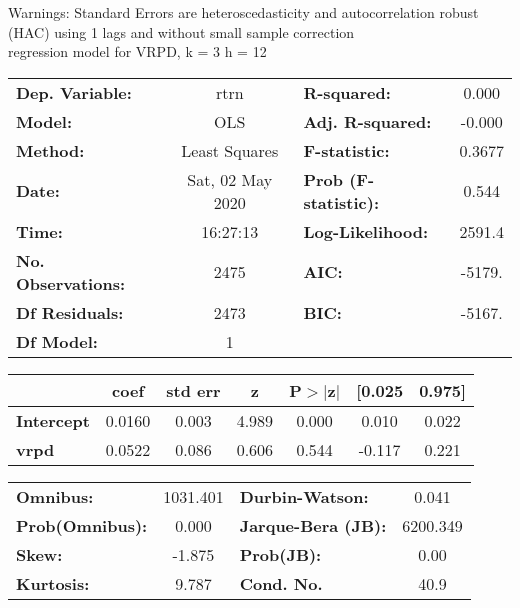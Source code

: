 Warnings: \newline
 [1] Standard Errors are heteroscedasticity and autocorrelation robust (HAC) using 1 lags and without small sample correction\\ 

regression model for VRPD, k = 3 h = 12\begin{center}
\begin{tabular}{lclc}
\toprule
\textbf{Dep. Variable:}    &       rtrn       & \textbf{  R-squared:         } &     0.000   \\
\textbf{Model:}            &       OLS        & \textbf{  Adj. R-squared:    } &    -0.000   \\
\textbf{Method:}           &  Least Squares   & \textbf{  F-statistic:       } &    0.3677   \\
\textbf{Date:}             & Sat, 02 May 2020 & \textbf{  Prob (F-statistic):} &    0.544    \\
\textbf{Time:}             &     16:27:13     & \textbf{  Log-Likelihood:    } &    2591.4   \\
\textbf{No. Observations:} &        2475      & \textbf{  AIC:               } &    -5179.   \\
\textbf{Df Residuals:}     &        2473      & \textbf{  BIC:               } &    -5167.   \\
\textbf{Df Model:}         &           1      & \textbf{                     } &             \\
\bottomrule
\end{tabular}
\begin{tabular}{lcccccc}
                   & \textbf{coef} & \textbf{std err} & \textbf{z} & \textbf{P$> |$z$|$} & \textbf{[0.025} & \textbf{0.975]}  \\
\midrule
\textbf{Intercept} &       0.0160  &        0.003     &     4.989  &         0.000        &        0.010    &        0.022     \\
\textbf{vrpd}      &       0.0522  &        0.086     &     0.606  &         0.544        &       -0.117    &        0.221     \\
\bottomrule
\end{tabular}
\begin{tabular}{lclc}
\textbf{Omnibus:}       & 1031.401 & \textbf{  Durbin-Watson:     } &    0.041  \\
\textbf{Prob(Omnibus):} &   0.000  & \textbf{  Jarque-Bera (JB):  } & 6200.349  \\
\textbf{Skew:}          &  -1.875  & \textbf{  Prob(JB):          } &     0.00  \\
\textbf{Kurtosis:}      &   9.787  & \textbf{  Cond. No.          } &     40.9  \\
\bottomrule
\end{tabular}
\end{center}


